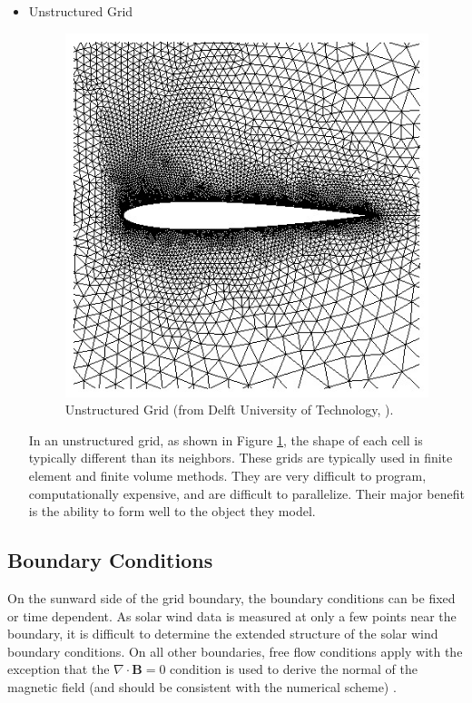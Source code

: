 \begin{itemize}
  \item Unstructured Grid \\
  \begin{figure}
  	\begin{centering}
  	\includegraphics[scale=0.45]{images/Unstructured.jpg}
  	\caption{Unstructured Grid (from Delft University of Technology,
  	\citeyear{Unstruc}).}
  	\label{fig:Unstructured}
  	\end{centering}
  	\figSpace
  \end{figure}
  In an unstructured grid, as shown in Figure \ref{fig:Unstructured}, the shape
  of each cell is typically different than its neighbors. These grids are
  typically used in finite element and finite volume methods. They are very
  difficult to program, computationally expensive, and are difficult to
  parallelize. Their major benefit is the ability to form well to the object
  they model.
\end{itemize}

\subsection{Boundary Conditions}
On the sunward side of the grid boundary, the boundary conditions can be fixed
or time dependent. As solar wind data is measured at only a few points
near the boundary, it is difficult to determine the extended structure of the
solar wind boundary conditions. On all other boundaries, free flow conditions apply
with the exception that the $\nabla \cdot \mathbf{B} = 0$ condition is used to derive the
normal of the magnetic field (and should be consistent with the numerical
scheme) \citep{Raeder2003}.

